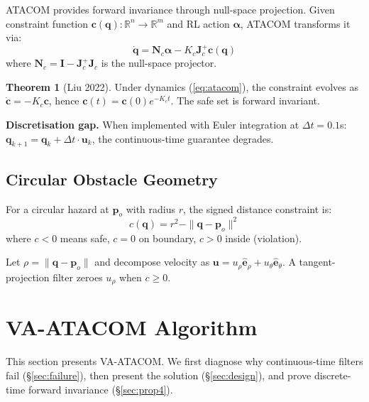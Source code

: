 \documentclass[letterpaper]{article}
\begin{document}
ATACOM \cite{liu2022} provides forward invariance through null-space projection. Given constraint function $\boldsymbol{c}(\boldsymbol{q}): \mathbb{R}^n \to \mathbb{R}^m$ and RL action $\boldsymbol{\alpha}$, ATACOM transforms it via:
\begin{equation}
\dot{\boldsymbol{q}} = \boldsymbol{N}_c \boldsymbol{\alpha} - K_c \boldsymbol{J}_c^+ \boldsymbol{c}(\boldsymbol{q})
\label{eq:atacom}
\end{equation}
where $\boldsymbol{N}_c = \boldsymbol{I} - \boldsymbol{J}_c^+ \boldsymbol{J}_c$ is the null-space projector.

\textbf{Theorem 1} (Liu 2022). Under dynamics (\ref{eq:atacom}), the constraint evolves as $\dot{\boldsymbol{c}} = -K_c \boldsymbol{c}$, hence $\boldsymbol{c}(t) = \boldsymbol{c}(0) e^{-K_c t}$. The safe set is forward invariant.

\textbf{Discretisation gap.} When implemented with Euler integration at $\Delta t = 0.1$s: $\boldsymbol{q}_{k+1} = \boldsymbol{q}_k + \Delta t \cdot \boldsymbol{u}_k$, the continuous-time guarantee degrades.

\subsection{Circular Obstacle Geometry}

For a circular hazard at $\boldsymbol{p}_o$ with radius $r$, the signed distance constraint is:
\begin{equation}
c(\boldsymbol{q}) = r^2 - \|\boldsymbol{q} - \boldsymbol{p}_o\|^2
\end{equation}
where $c < 0$ means safe, $c = 0$ on boundary, $c > 0$ inside (violation).

Let $\rho = \|\boldsymbol{q} - \boldsymbol{p}_o\|$ and decompose velocity as $\boldsymbol{u} = u_\rho \hat{\boldsymbol{e}}_\rho + u_\theta \hat{\boldsymbol{e}}_\theta$. A tangent-projection filter zeroes $u_\rho$ when $c \ge 0$.

\section{VA-ATACOM Algorithm}
\label{sec:method}

This section presents VA-ATACOM. We first diagnose why continuous-time filters fail (\S\ref{sec:failure}), then present the solution (\S\ref{sec:design}), and prove discrete-time forward invariance (\S\ref{sec:prop4}).
\end{document}
